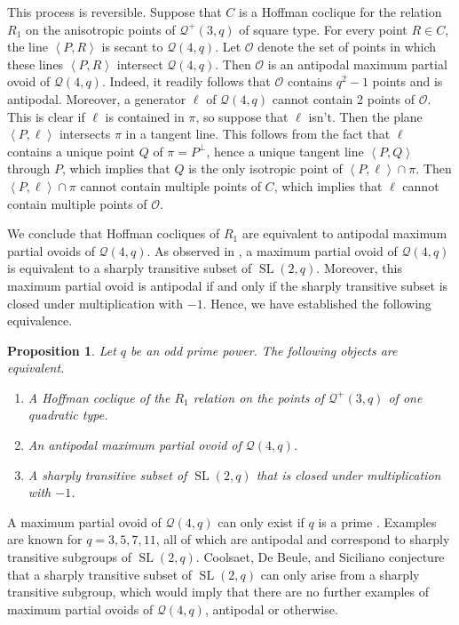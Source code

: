 \documentclass[a4paper]{article}
\newtheorem{prop}[thm]{Proposition}
\theoremstyle{definition}
\newcommand{\vspan}[1]{\left \langle #1 \right \rangle}
\newcommand{\mq}{\mathcal Q}
\newcommand{\mo}{\mathcal O}
\DeclareMathOperator{\SL}{SL}
\begin{document}
This process is reversible.
Suppose that $C$ is a Hoffman coclique for the relation $R_1$ on the anisotropic points of $\mq^+(3,q)$ of square type.
For every point $R \in C$, the line $\vspan{P,R}$ is secant to $\mq(4,q)$.
Let $\mo$ denote the set of points in which these lines $\vspan{P,R}$ intersect $\mq(4,q)$.
Then $\mo$ is an antipodal maximum partial ovoid of $\mq(4,q)$.
Indeed, it readily follows that $\mo$ contains $q^2-1$ points and is antipodal.
Moreover, a generator $\ell$ of $\mq(4,q)$ cannot contain 2 points of $\mo$.
This is clear if $\ell$ is contained in $\pi$, so suppose that $\ell$ isn't.
Then the plane $\vspan{P,\ell}$ intersects $\pi$ in a tangent line.
This follows from the fact that $\ell$ contains a unique point $Q$ of $\pi = P^\perp$, hence a unique tangent line $\vspan{P,Q}$ through $P$, which implies that $Q$ is the only isotropic point of $\vspan{P,\ell} \cap \pi$.
Then $\vspan{P,\ell} \cap \pi$ cannot contain multiple points of $C$, which implies that $\ell$ cannot contain multiple points of $\mo$.

We conclude that Hoffman cocliques of $R_1$ are equivalent to antipodal maximum partial ovoids of $\mq(4,q)$.
As observed in \cite{CoolsaetDeBeuleSiciliano}, a maximum partial ovoid of $\mq(4,q)$ is equivalent to a sharply transitive subset of $\SL(2,q)$.
Moreover, this maximum partial ovoid is antipodal if and only if the sharply transitive subset is closed under multiplication with $-1$.
Hence, we have established the following equivalence.

\begin{prop}
 Let $q$ be an odd prime power.
 The following objects are equivalent.
 \begin{enumerate}
  \item A Hoffman coclique of the $R_1$ relation on the points of $\mq^+(3,q)$ of one quadratic type.
  \item An antipodal maximum partial ovoid of $\mq(4,q)$.
  \item A sharply transitive subset of $\SL(2,q)$ that is closed under multiplication with $-1$.
 \end{enumerate}
\end{prop}

A maximum partial ovoid of $\mq(4,q)$ can only exist if $q$ is a prime \cite{DeBeuleGacs}.
Examples are known for $q = 3,5,7,11$, all of which are antipodal and correspond to sharply transitive subgroups of $\SL(2,q)$.
Coolsaet, De Beule, and Siciliano \cite{CoolsaetDeBeuleSiciliano} conjecture that a sharply transitive subset of $\SL(2,q)$ can only arise from a sharply transitive subgroup, which would imply that there are no further examples of maximum partial ovoids of $\mq(4,q)$, antipodal or otherwise.
\end{document}
